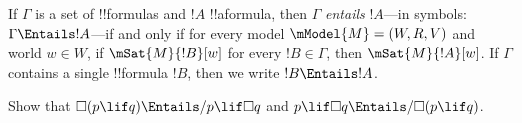 \documentclass[../../../include/open-logic-section]{subfiles}
\begin{document}


\begin{defn}
  If $\Gamma$ is a set of !!{formula}s and $!A$ !!a{formula}, then
  $\Gamma$ \emph{entails} $!A$---in symbols: $\Gamma \Entails !A$---if
  and only if for every model $\mModel{M} = (W, R, V)$ and world $w \in W$, if
  $\mSat{M}{!B}[w]$ for every $!B \in \Gamma$, then
  $\mSat{M}{!A}[w]$. If $\Gamma$ contains a single !!{formula} $!B$,
  then we write $!B \Entails !A$.
\end{defn}

\begin{prob}
  Show that $\Box (p \lif q) \Entails/ p \lif \Box q$ and $p \lif \Box
  q \Entails/\Box (p \lif q)$.
\end{prob}
\end{document}

